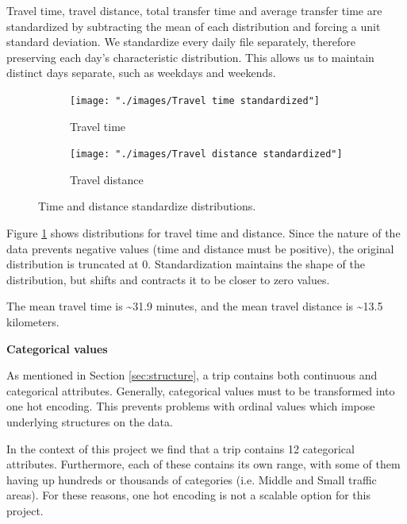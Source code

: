 \documentclass{article}
\begin{document}
Travel time, travel distance, total transfer time and average transfer time are standardized by subtracting the mean of each distribution and forcing a unit standard deviation. We standardize every daily file separately, therefore preserving each day's characteristic distribution. This allows us to maintain distinct days separate, such as weekdays and weekends.

\begin{figure}[H]
  \centering
  \begin{subfigure}[b]{.45\textwidth}
  	\centering
  	\texttt{[image: "./images/Travel time standardized"]}
  	\caption{Travel time}
  \end{subfigure}
  \begin{subfigure}[b]{.45\textwidth}
  	\centering
  	\texttt{[image: "./images/Travel distance standardized"]}
  	\caption{Travel distance}
  \end{subfigure}
  \caption{Time and distance standardize distributions.}
  	\label{fig:preprocessing/timeDist}
\end{figure}

Figure \ref{fig:preprocessing/timeDist} shows distributions for travel time and distance. Since the nature of the data prevents negative values (time and distance must be positive), the original distribution is truncated at 0. Standardization maintains the shape of the distribution, but shifts and contracts it to be closer to zero values.

The mean travel time is \textasciitilde 31.9 minutes, and the mean travel distance is \textasciitilde 13.5 kilometers.  %


\textbf{Categorical values}

As mentioned in Section \ref{sec:structure}, a trip contains both continuous and categorical attributes. Generally, categorical values must to be transformed into one hot encoding. This prevents problems with ordinal values which impose underlying structures on the data.

In the context of this project we find that a trip contains 12 categorical attributes. Furthermore, each of these contains its own range, with some of them having up hundreds or thousands of categories (i.e. Middle and Small traffic areas). For these reasons, one hot encoding is not a scalable option for this project.
\end{document}
